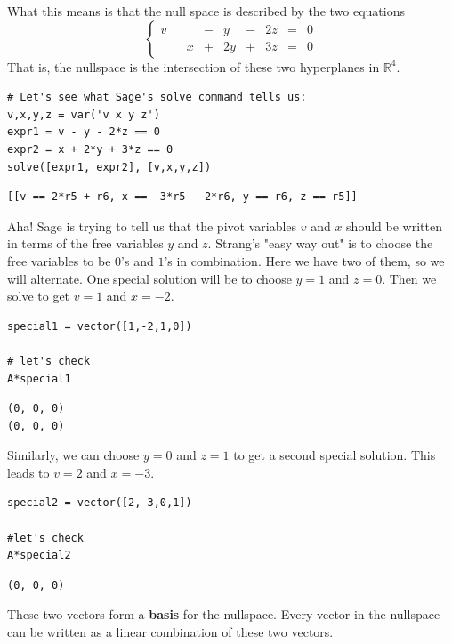 \documentclass[10pt,]{book}
\newcommand{\terminology}[1]{\textbf{#1}}
\theoremstyle{plain}
\numberwithin{equation}{section}
\begin{document}
      What this means is that the null space is described by the two equations
      \[
        \left\{
        \begin{array}{rrrrrrrrr}
        v & & & - & y & - & 2 z & = & 0 \\
          & & x & + & 2y & + & 3 z & = & 0
        \end{array}\right.
      \]
      That is, the nullspace is the intersection of these two hyperplanes in
      \(\mathbb{R}^4\).
\begin{lstlisting}[style=sageinput]
# Let's see what Sage's solve command tells us:
v,x,y,z = var('v x y z')
expr1 = v - y - 2*z == 0
expr2 = x + 2*y + 3*z == 0
solve([expr1, expr2], [v,x,y,z])
\end{lstlisting}
\begin{lstlisting}[style=sageoutput]
[[v == 2*r5 + r6, x == -3*r5 - 2*r6, y == r6, z == r5]]
\end{lstlisting}
\par

      Aha! Sage is trying to tell us that the pivot variables \(v\)
      and \(x\) should be
      written in terms of the free variables \(y\) and \(z\).
      Strang's "easy way out" is to choose the free variables to be
      \(0\)'s and \(1\)'s in
      combination. Here we have two of them, so we will alternate.
      One special solution will be to choose \(y = 1\) and \(z=0\).
      Then we solve to get \(v = 1\) and \(x = -2\).
\begin{lstlisting}[style=sageinput]
special1 = vector([1,-2,1,0])

# let's check
A*special1
\end{lstlisting}
\begin{lstlisting}[style=sageoutput]
(0, 0, 0)
(0, 0, 0)
\end{lstlisting}
\par

      Similarly, we can choose \(y=0\) and
      \(z=1\) to get a second special solution. This leads to
      \(v=2\) and \(x = -3\).
\begin{lstlisting}[style=sageinput]
special2 = vector([2,-3,0,1])

#let's check
A*special2
\end{lstlisting}
\begin{lstlisting}[style=sageoutput]
(0, 0, 0)
\end{lstlisting}
\par

      These two vectors form a \terminology{basis} for the nullspace. Every
      vector in the nullspace can be written as a linear combination of
      these two vectors.
\par
\end{document}
